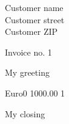 \documentclass{letter}
\date{23. May 2009}
\begin{document}
  \begin{letter}{Customer name \\ Customer street \\ Customer ZIP}
    \opening{Invoice no. 1}
    My greeting
    \begin{invoice}{Euro}{0}
       {1000.00} {1}
    \end{invoice}
    \closing{My closing}
  \end{letter}
\end{document}
